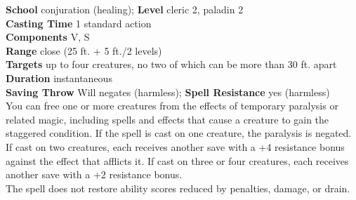 \textbf{School} conjuration (healing); \textbf{Level} cleric 2, paladin 2\\
\textbf{Casting Time} 1 standard action\\
\textbf{Components} V, S\\
\textbf{Range} close (25 ft. + 5 ft./2 levels)\\
\textbf{Targets} up to four creatures, no two of which can be more than 30 ft. apart\\
\textbf{Duration} instantaneous\\
\textbf{Saving Throw }Will negates (harmless); \textbf{Spell Resistance} yes (harmless)\\
You can free one or more creatures from the effects of temporary paralysis or related magic, including spells and effects that cause a creature to gain the staggered condition. If the spell is cast on one creature, the paralysis is negated. If cast on two creatures, each receives another save with a +4 resistance bonus against the effect that afflicts it. If cast on three or four creatures, each receives another save with a +2 resistance bonus.\\
The spell does not restore ability scores reduced by penalties, damage, or drain.\\

